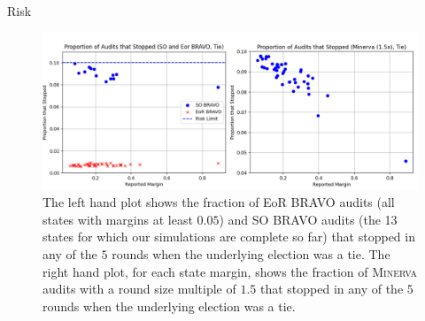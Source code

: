 \documentclass[final]{beamer}
\newcommand{\Minerva}{\textsc{Minerva}\xspace}
\newcommand{\BRAVO}{\textsc{BRAVO}\xspace}
\newlength{\colwidth}
\begin{document}
\begin{frame}[t]
\begin{columns}[t]
\begin{column}{\colwidth}
\begin{block}{Risk}
\begin{figure}
\includegraphics[width=\textwidth]{both_risk_plots.png}
\caption{The left hand plot shows the fraction of EoR \BRAVO audits (all states with margins at least $0.05$) and SO \BRAVO audits (the 13 states for which our simulations are complete so far) that stopped in any of the $5$ rounds when the underlying election was a tie. The right hand plot, for each state margin, shows the fraction of \Minerva audits with a round size multiple of $1.5$ that stopped in any of the $5$ rounds when the underlying election was a tie.}
\label{fig:risk}
\end{figure}
%
\end{block}


\end{column}
\end{columns}
\end{frame}
\end{document}

